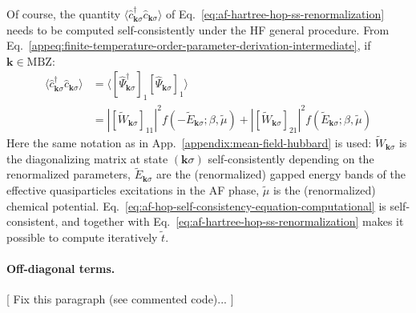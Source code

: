 Of course, the quantity $\langle \hat c_{\mathbf{k}\sigma}^\dagger  \hat c_{\mathbf{k}\sigma} \rangle$ of Eq.~\eqref{eq:af-hartree-hop-ss-renormalization} needs to be computed self-consistently under the HF general procedure. From Eq.~\eqref{appeq:finite-temperature-order-parameter-derivation-intermediate}, if $\mathbf{k}\in\mathrm{MBZ}$:
\begin{align}
	\langle
		\hat c_{\mathbf{k}\sigma}^\dagger 
		\hat c_{\mathbf{k}\sigma}
	\rangle &= \langle 
	[
		\hat \Psi_{\mathbf{k}\sigma}^\dagger
	]_1 [
		\hat \Psi_{\mathbf{k}\sigma}
	]_1
	\rangle \nonumber \\
	&= |[
		\tilde{W}_{\mathbf{k}\sigma}
	]_{11}|^2 f\left(
		-\tilde{E}_{\mathbf{k}\sigma}; \beta,\tilde{\mu}
	\right) + |[
		\tilde{W}_{\mathbf{k}\sigma}
	]_{21}|^2 f\left(
		\tilde{E}_{\mathbf{k}\sigma}; \beta,\tilde{\mu}
	\right)
	\label{eq:af-hop-self-consistency-equation-computational}
\end{align}
Here the same notation as in App.~\ref{appendix:mean-field-hubbard}  is used: $\tilde{W}_{\mathbf{k}\sigma}$ is the diagonalizing matrix at state $(\mathbf{k}\sigma)$ self-consistently depending on the renormalized parameters, $\tilde{E}_{\mathbf{k}\sigma}$ are the (renormalized) gapped energy bands of the effective quasiparticles excitations in the AF phase, $\tilde{\mu}$ is the (renormalized) chemical potential. Eq.~\eqref{eq:af-hop-self-consistency-equation-computational} is self-consistent, and together with Eq.~\eqref{eq:af-hartree-hop-ss-renormalization} makes it possible to compute iteratively $\tilde{t}$.

\paragraph{Off-diagonal terms.}

{\color{tabred}[
	Fix this paragraph (see commented code)...
]}

